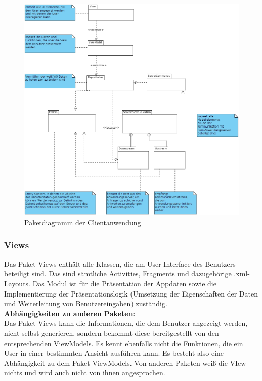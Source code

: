 \documentclass[11pt,a4paper]{article}
\begin{document}
\begin{figure}[H]
	\centering
	\includegraphics[scale=0.3]{../Klassendiagramme/Client_PackageDiagram.jpg}
	\caption{Paketdiagramm der Clientanwendung}
\end{figure}

\subsubsection{Views}
Das Paket Views enthält alle Klassen, die am User Interface des Benutzers beteiligt sind. Das sind sämtliche Activities, Fragments und dazugehörige .xml-Layouts. Das Modul ist für die Präsentation der Appdaten sowie die Implementierung der Präsentationslogik (Umsetzung der Eigenschaften der Daten und Weiterleitung von Benutzereingaben) zuständig.\\

\textbf{Abhängigkeiten zu anderen Paketen:}\\
Das Paket Views kann die Informationen, die dem Benutzer angezeigt werden, nicht selbst generieren, sondern bekommt diese bereitgestellt von den entsprechenden ViewModels. Es kennt ebenfalls nicht die Funktionen, die ein User in einer bestimmten Ansicht ausführen kann. Es besteht also eine Abhängigkeit zu dem Paket ViewModels. Von anderen Paketen weiß die VIew nichts und wird auch nicht von ihnen angesprochen.\\
\end{document}
